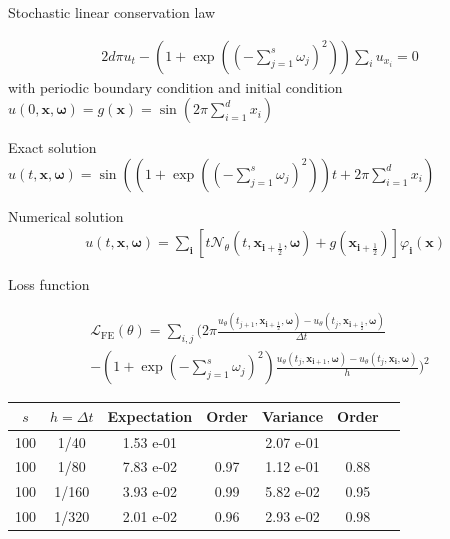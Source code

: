 \documentclass[aspectratio=169]{beamer}
\def\bom{{\mathbf{\omega}}}
\begin{document}
\begin{frame}{Stochastic linear conservation law}

\begin{equation*}
	\begin{aligned}
		2 d  \pi u_t  - (1+\exp((-\sum_{j=1}^s \omega_j)^2)) \sum_{i} u_{x_i}  = 0 
	\end{aligned}
\end{equation*}
with periodic boundary condition and initial condition $u(0,\boldsymbol{x},\boldsymbol{\omega}) = g(\boldsymbol{x}) =  \sin\left(2\pi \sum_{i=1}^d x_i \right) $ 

\medskip
Exact solution $u(t,\boldsymbol{x},\boldsymbol{\omega}) = \sin\left((1+\exp ( (-\sum_{j=1}^s \omega_j)^2) ) t + 2\pi \sum_{i=1}^d x_i\right)$

\medskip
Numerical solution
\begin{equation*}
\begin{aligned}
&u(t,\boldsymbol{x},\boldsymbol{\omega}) = \sum_{\boldsymbol{i}} [t\mathcal{N}_\theta(t,\boldsymbol{x}_{\boldsymbol{i}+\frac{1}{2}},\boldsymbol{\omega}) + g(\boldsymbol{x}_{\boldsymbol{i}+\frac{1}{2}} )]\varphi_{\boldsymbol{i}}(\boldsymbol{x})
\end{aligned}
\end{equation*}

\end{frame}

\begin{frame}{Loss function}

\begin{multline*}
\mathcal{L}_{\mathrm{FE}}(\theta) = \sum_{i,j}\bigg(2\pi \frac{ u_{\theta}(t_{j+1},\boldsymbol{x}_{\boldsymbol{i}+\frac12},\boldsymbol{\omega}) - u_{\theta}(t_j,\boldsymbol{x}_{\boldsymbol{i}+\frac12},\boldsymbol{\omega})}{\Delta t} \\
- (1+\exp(-\sum_{j=1}^s \omega_j)^2) \frac{u_{\theta}(t_j,\boldsymbol{x}_{\boldsymbol{i}+1},\bom) -u_{\theta}(t_j,\boldsymbol{x}_{\boldsymbol{i}},\boldsymbol{\omega})}{h} \bigg)^2
\end{multline*}

\begin{table}[ht]
 \centering
 \begin{tabular}{|c|c|c|c|c|c|c|}
 \hline
     $s$ & $h = \Delta t$ &  Expectation & Order & Variance  & Order\\
 	\hline
	 100 & 1/40 & 1.53 e-01 &  & 2.07 e-01 & \\
	 100 & 1/80 & 7.83 e-02 & 0.97 &  1.12 e-01 & 0.88\\
	 100 & 1/160 & 3.93 e-02 & 0.99 & 5.82 e-02 & 0.95\\
	 100 & 1/320 & 2.01 e-02 & 0.96 &  2.93 e-02 & 0.98\\
\hline
 \end{tabular}
\label{tbl:cv error stochastic}	
\end{table}
\end{frame}
\end{document}
